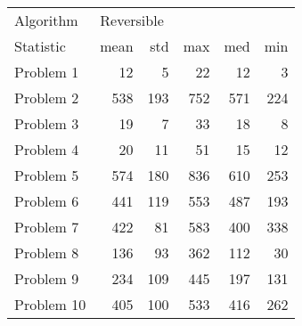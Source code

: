 \begin{tabular}{lrrrrr}
\toprule
Algorithm & \multicolumn{5}{l}{Reversible} \\
Statistic &       mean &  std &  max &  med &  min \\
\midrule
Problem 1  &         12 &    5 &   22 &   12 &    3 \\
Problem 2  &        538 &  193 &  752 &  571 &  224 \\
Problem 3  &         19 &    7 &   33 &   18 &    8 \\
Problem 4  &         20 &   11 &   51 &   15 &   12 \\
Problem 5  &        574 &  180 &  836 &  610 &  253 \\
Problem 6  &        441 &  119 &  553 &  487 &  193 \\
Problem 7  &        422 &   81 &  583 &  400 &  338 \\
Problem 8  &        136 &   93 &  362 &  112 &   30 \\
Problem 9  &        234 &  109 &  445 &  197 &  131 \\
Problem 10 &        405 &  100 &  533 &  416 &  262 \\
\bottomrule
\end{tabular}
